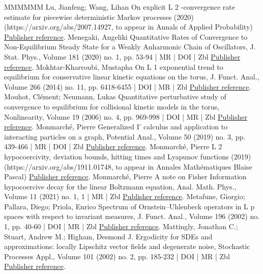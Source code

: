 \documentclass[10pt,a4paper]{article}
\numberwithin{equation}{section}
\begin{document}
\begin{thebibliography}{MMMMMM}
 Lu, Jianfeng; Wang, Lihan On explicit L 2 -convergence rate estimate for piecewise deterministic Markov processes (2020) (https://arxiv.org/abs/2007.14927, to appear in Annals of Applied Probability) \href{https://ahl.centre-mersenne.org/item/AHL_2022__5__523_0/#LW20}{Publisher reference}.
 Menegaki, Angeliki Quantitative Rates of Convergence to Non-Equilibrium Steady State for a Weakly Anharmonic Chain of Oscillators, J. Stat. Phys., Volume 181 (2020) no. 1, pp. 53-94 | MR | DOI | Zbl \href{https://ahl.centre-mersenne.org/item/AHL_2022__5__523_0/#Menegaki19}{Publisher reference}.
 Mokhtar-Kharroubi, Mustapha On L 1 exponential trend to equilibrium for conservative linear kinetic equations on the torus, J. Funct. Anal., Volume 266 (2014) no. 11, pp. 6418-6455 | DOI | MR | Zbl \href{https://ahl.centre-mersenne.org/item/AHL_2022__5__523_0/#Mokhtar14}{Publisher reference}.
 Mouhot, Clément; Neumann, Lukas Quantitative perturbative study of convergence to equilibrium for collisional kinetic models in the torus, Nonlinearity, Volume 19 (2006) no. 4, pp. 969-998 | DOI | MR | Zbl \href{https://ahl.centre-mersenne.org/item/AHL_2022__5__523_0/#MN06}{Publisher reference}.
 Monmarché, Pierre Generalized Γ calculus and application to interacting particles on a graph, Potential Anal., Volume 50 (2019) no. 3, pp. 439-466 | MR | DOI | Zbl \href{https://ahl.centre-mersenne.org/item/AHL_2022__5__523_0/#Mon19a}{Publisher reference}.
 Monmarché, Pierre L 2 hypocoercivity, deviation bounds, hitting times and Lyapunov functions (2019) (https://arxiv.org/abs/1911.01748, to appear in Annales Mathématiques Blaise Pascal) \href{https://ahl.centre-mersenne.org/item/AHL_2022__5__523_0/#Mon19b}{Publisher reference}.
 Monmarché, Pierre A note on Fisher Information hypocoercive decay for the linear Boltzmann equation, Anal. Math. Phys., Volume 11 (2021) no. 1, 1 | MR | Zbl \href{https://ahl.centre-mersenne.org/item/AHL_2022__5__523_0/#Mon17}{Publisher reference}.
 Metafune, Giorgio; Pallara, Diego; Priola, Enrico Spectrum of Ornstein–Uhlenbeck operators in L p spaces with respect to invariant measures, J. Funct. Anal., Volume 196 (2002) no. 1, pp. 40-60 | DOI | MR | Zbl \href{https://ahl.centre-mersenne.org/item/AHL_2022__5__523_0/#MPP02}{Publisher reference}.
 Mattingly, Jonathan C.; Stuart, Andrew M.; Higham, Desmond J. Ergodicity for SDEs and approximations: locally Lipschitz vector fields and degenerate noise, Stochastic Processes Appl., Volume 101 (2002) no. 2, pp. 185-232 | DOI | MR | Zbl \href{https://ahl.centre-mersenne.org/item/AHL_2022__5__523_0/#MSH02}{Publisher reference}.

\end{thebibliography}
\end{document}
